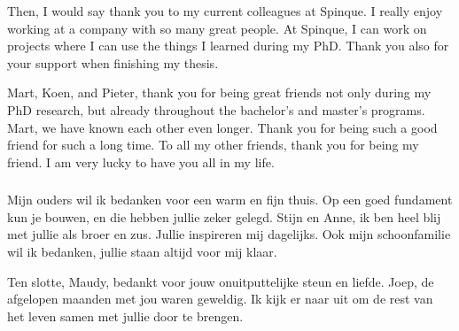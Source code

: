 Then, I would say thank you to my current colleagues at Spinque. I really enjoy working at a company with so many great people. At Spinque, I can work on projects where I can use the things I learned during my PhD. Thank you also for your support when finishing my thesis. 

Mart, Koen, and Pieter, thank you for being great friends not only during my PhD research, but already throughout the bachelor's and master's programs. Mart, we have known each other even longer. Thank you for being such a good friend for such a long time. To all my other friends, thank you for being my friend. I am very lucky to have you all in my life. 
\subsubsection*{}
Mijn ouders wil ik bedanken voor een warm en fijn thuis. Op een goed fundament kun je bouwen, en die hebben jullie zeker gelegd. Stijn en Anne, ik ben heel blij met jullie als broer en zus. Jullie inspireren mij dagelijks. Ook mijn schoonfamilie wil ik bedanken, jullie staan altijd voor mij klaar.

Ten slotte, Maudy, bedankt voor jouw onuitputtelijke steun en liefde. Joep, de afgelopen maanden met jou waren geweldig. Ik kijk er naar uit om de rest van het leven samen met jullie door te brengen. 
